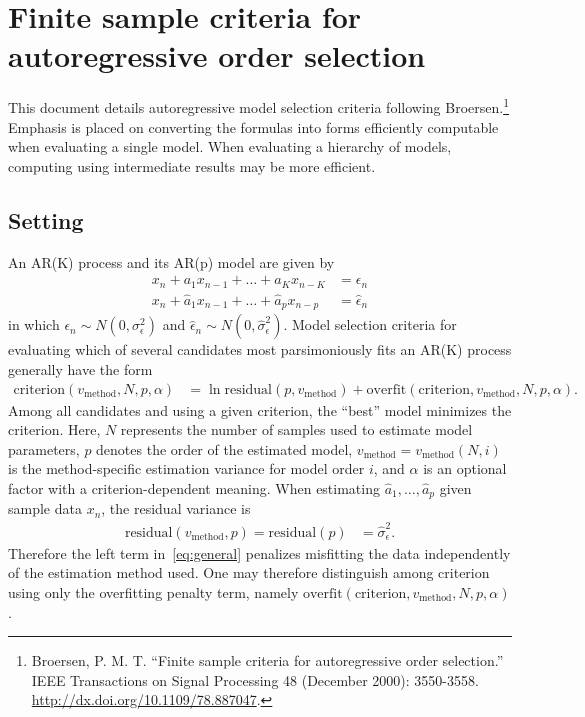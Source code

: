 \documentclass[12pt,letterpaper]{article}
\begin{document}
\section*{Finite sample criteria for autoregressive order selection}

This document details autoregressive model selection criteria following
Broersen.\footnote{Broersen, P. M. T. ``Finite sample criteria for
autoregressive order selection.'' IEEE Transactions on Signal Processing 48
(December 2000): 3550-3558.  \url{http://dx.doi.org/10.1109/78.887047}.}
Emphasis is placed on converting the formulas into forms efficiently computable
when evaluating a single model.  When evaluating a hierarchy of models,
computing using intermediate results may be more efficient.

\subsection*{Setting}

An AR(K) process and its AR(p) model are given by
\begin{subequations}
\begin{align}
    x_n+a_1x_{n-1}+\dots+a_Kx_{n-K}&=\epsilon_n
    \\
    {x}_n+\hat{a}_1x_{n-1}+\dots+\hat{a}_px_{n-p}&=\hat{\epsilon}_n
\end{align}
\end{subequations}
in which $\epsilon_n\sim N\left(0,\sigma_{\epsilon}^2\right)$ and
$\hat{\epsilon}_n\sim N\left(0,\hat{\sigma}_{\epsilon}^2\right)$.
Model selection criteria for evaluating which of several candidates most
parsimoniously fits an AR(K) process generally have the form
\begin{align}
    \label{eq:general}
    \text{criterion}\!\left(v_\text{method},N,p,\alpha\right)
    &=
    \ln \text{residual}\!\left(p,v_\text{method}\right)
    +
    \text{overfit}\!\left(\text{criterion},v_\text{method},N,p,\alpha\right)
    .
\end{align}
Among all candidates and using a given criterion, the ``best'' model minimizes
the criterion.  Here, $N$ represents the number of samples used to estimate
model parameters, $p$ denotes the order of the estimated model,
$v_\text{method}=v_\text{method}\!\left(N,i\right)$ is the method-specific
estimation variance for model order $i$, and $\alpha$ is an optional factor
with a criterion-dependent meaning.  When estimating
$\hat{a}_1,\dots,\hat{a}_p$ given sample data $x_n$, the residual variance is
\begin{align}
    \text{residual}\!\left(v_\text{method},p\right)
    =
    \text{residual}\!\left(p\right)
    &=
    \hat{\sigma}_\epsilon^2
    .
\end{align}
Therefore the left term in~\eqref{eq:general} penalizes misfitting the data
independently of the estimation method used.  One may therefore distinguish
among criterion using only the overfitting penalty term, namely
$\text{overfit}\!\left(\text{criterion},v_\text{method},N,p,\alpha\right)$.
\end{document}
